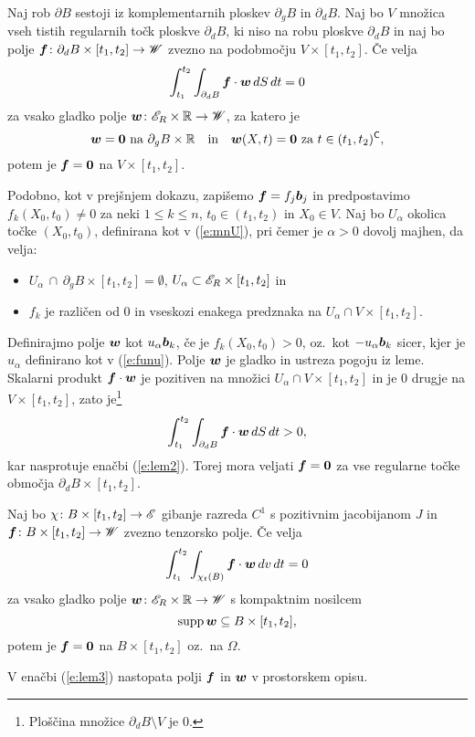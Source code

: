 \begin{lema}\label{l:2}
	Naj rob $\partial B$ sestoji iz komplementarnih ploskev $\partial_g B$ in
	$\partial_d B$. Naj bo $V$ množica vseh tistih regularnih točk ploskve $\partial_d B$,
	ki niso na robu ploskve $\partial_d B$ in naj bo 
	polje $\boldsymbol f\colon \partial_d B\times[t_1,t_2]\to \mathscr W$ zvezno na podobmočju $V\times[t_1,t_2]$.
	Če velja
	\begin{equation}\label{e:lem2}
		\int_{t_1}^{t_2}\int_{\partial_d B} \boldsymbol f\cdot \boldsymbol w\,dS\,dt = 0
	\end{equation}
	za vsako gladko polje $\boldsymbol w\colon\mathscr E_R\times\mathbb R\to\mathscr W$, za katero je
	\[
		\boldsymbol w=\boldsymbol 0\ \textrm{na}\ \partial_g B\times \mathbb R\quad\textrm{in}\quad
		\boldsymbol w(X,t)=\boldsymbol 0\ \textrm{za}\ t\in(t_1,t_2)^{\mathsf C},
	\]
	potem je $\boldsymbol f=\boldsymbol 0$ na $V\times [t_1,t_2]$.
\end{lema}

\proof
	Podobno, kot v prejšnjem dokazu, zapišemo $\boldsymbol f=f_j\boldsymbol b_j$ in predpostavimo
	$f_{k}(X_0,t_0)\neq 0$ za neki $1\leq k\leq n$, $t_0\in (t_1,t_2)$ in $X_0\in V$.
	Naj bo $U_{\alpha}$ okolica točke $(X_0,t_0)$, definirana kot v (\ref{e:mnU}),
	pri čemer je $\alpha>0$ dovolj majhen, da velja:
	\begin{itemize}
		\item $U_{\alpha}\,\cap\, \partial_g B\times [t_1,t_2]=\emptyset$,
		$U_{\alpha}\subset \mathscr E_R\times [t_1,t_2]$ in
		\item $f_k$ je različen od 0 in vseskozi enakega predznaka na
		$U_{\alpha}\cap V\times [t_1,t_2]$.
	\end{itemize}
	
	Definirajmo polje $\boldsymbol w$ kot $u_{\alpha}\boldsymbol b_k$, če je $f_{k}(X_0,t_0) > 0$, oz.~kot
	$-u_{\alpha}\boldsymbol b_k$ sicer, kjer je $u_{\alpha}$ definirano kot v (\ref{e:funu}).
	Polje $\boldsymbol w$ je gladko in ustreza pogoju iz leme.
	Skalarni produkt $\boldsymbol f\cdot\boldsymbol w$ je pozitiven na množici $U_{\alpha}\cap V\times [t_1,t_2]$
	in je 0 drugje na $V\times [t_1,t_2]$, zato je\footnote{Ploščina množice $\partial_dB\setminus V$ je 0.}
	\[
		\int_{t_1}^{t_2}\int_{\partial_d B} \boldsymbol f\cdot \boldsymbol w\,dS\,dt > 0,
	\]
	kar nasprotuje enačbi (\ref{e:lem2}). Torej mora veljati $\boldsymbol f=\boldsymbol 0$ za vse regularne točke območja
	$\partial_d B\times [t_1,t_2]$.
\endproof

\begin{lema}
	Naj bo $\chi\colon B\times[t_1,t_2]\to\mathscr E$ gibanje razreda $C^1$ s pozitivnim jacobijanom $J$ in
	$\boldsymbol f\colon B\times[t_1,t_2]\to\mathscr W$ zvezno tenzorsko polje. Če velja
	\begin{equation} \label{e:lem3}
		\int_{t_1}^{t_2}\int_{\chi_t(B)}\boldsymbol f\cdot \boldsymbol w \,dv\,dt=0
	\end{equation}
	za vsako gladko polje $\boldsymbol w\colon\mathscr E_R\times\mathbb R\to\mathscr W$ s kompaktnim nosilcem
	\[ \mathrm{supp}\,\boldsymbol w\subseteq B\times[t_1,t_2], \]
	potem je $\boldsymbol f=\boldsymbol 0$ na $B\times[t_1,t_2]$ oz.~na $\Omega$.
\end{lema}
V enačbi (\ref{e:lem3}) nastopata polji $\boldsymbol f$ in $\boldsymbol w$ v prostorskem opisu.

